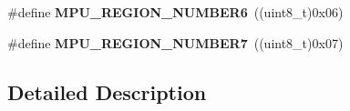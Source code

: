 \begin{DoxyCompactItemize}
\item 
\#define {\bfseries M\+P\+U\+\_\+\+R\+E\+G\+I\+O\+N\+\_\+\+N\+U\+M\+B\+E\+R6}~((uint8\+\_\+t)0x06)\hypertarget{group___c_o_r_t_e_x___m_p_u___region___number_ga03284e00d186a97fa3524d38c386912d}{}\label{group___c_o_r_t_e_x___m_p_u___region___number_ga03284e00d186a97fa3524d38c386912d}

\item 
\#define {\bfseries M\+P\+U\+\_\+\+R\+E\+G\+I\+O\+N\+\_\+\+N\+U\+M\+B\+E\+R7}~((uint8\+\_\+t)0x07)\hypertarget{group___c_o_r_t_e_x___m_p_u___region___number_ga851456a7bd43a6af2b34bc18e75f61b5}{}\label{group___c_o_r_t_e_x___m_p_u___region___number_ga851456a7bd43a6af2b34bc18e75f61b5}

\end{DoxyCompactItemize}


\subsection{Detailed Description}

